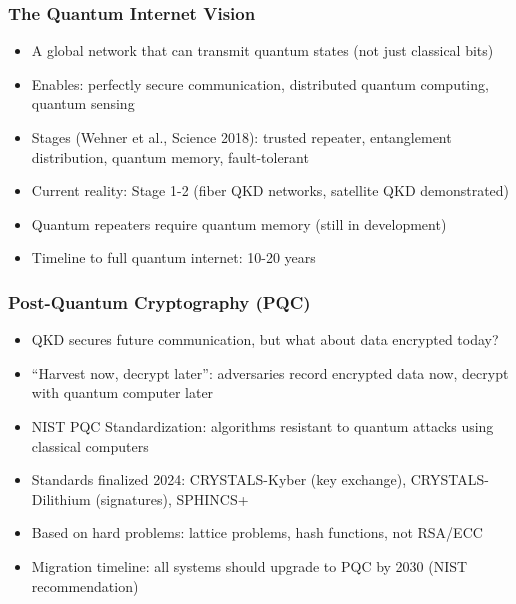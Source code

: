 \begin{frame}[fragile]\frametitle{The Quantum Internet Vision}
\begin{itemize}
\item A global network that can transmit quantum states (not just classical bits)
\item Enables: perfectly secure communication, distributed quantum computing, quantum sensing
\item Stages (Wehner et al., Science 2018): trusted repeater, entanglement distribution, quantum memory, fault-tolerant
\item Current reality: Stage 1-2 (fiber QKD networks, satellite QKD demonstrated)
\item Quantum repeaters require quantum memory (still in development)
\item Timeline to full quantum internet: 10-20 years
\end{itemize}
\end{frame}

\begin{frame}[fragile]\frametitle{Post-Quantum Cryptography (PQC)}
\begin{itemize}
\item QKD secures future communication, but what about data encrypted today?
\item ``Harvest now, decrypt later'': adversaries record encrypted data now, decrypt with quantum computer later
\item NIST PQC Standardization: algorithms resistant to quantum attacks using classical computers
\item Standards finalized 2024: CRYSTALS-Kyber (key exchange), CRYSTALS-Dilithium (signatures), SPHINCS+
\item Based on hard problems: lattice problems, hash functions, not RSA/ECC
\item Migration timeline: all systems should upgrade to PQC by 2030 (NIST recommendation)
\end{itemize}
\end{frame}

